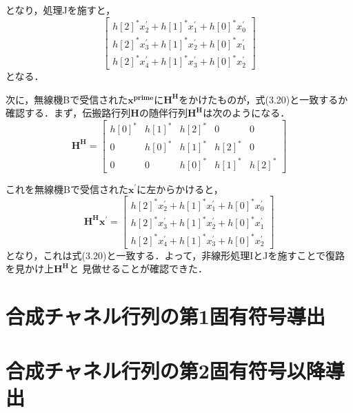 となり，処理Jを施すと，
\begin{equation}
    \left[
        \begin{array}{c}
            h[2]^*x_2^{\prime}+h[1]^*x_1^{\prime}+h[0]^*x_0^{\prime} \\
            h[2]^*x_3^{\prime}+h[1]^*x_2^{\prime}+h[0]^*x_1^{\prime} \\
            h[2]^*x_4^{\prime}+h[1]^*x_3^{\prime}+h[0]^*x_2^{\prime}
        \end{array}
    \right]
\end{equation}
となる．

次に，無線機Bで受信された$\bm{x^{prime}}$に$\bm{H^H}$をかけたものが，式(3.20)と一致するか
確認する．まず，伝搬路行列$\bm{H}$の随伴行列$\bm{H^H}$は次のようになる．
\begin{equation}
    \bm{H^H} = \left[
        \begin{array}{ccccc}
            h[0]^* & h[1]^* & h[2]^* & 0 & 0 \\
            0 & h[0]^* & h[1]^* & h[2]^* & 0 \\
            0 & 0 & h[0]^* & h[1]^* & h[2]^*
        \end{array}
    \right]
\end{equation}

これを無線機Bで受信された$\bm{x^{\prime}}$に左からかけると，
\begin{equation}
    \bm{H^Hx^{\prime}} = \left[
        \begin{array}{c}
            h[2]^*x_2^{\prime}+h[1]^*x_1^{\prime}+h[0]^*x_0^{\prime} \\
            h[2]^*x_3^{\prime}+h[1]^*x_2^{\prime}+h[0]^*x_1^{\prime} \\
            h[2]^*x_4^{\prime}+h[1]^*x_3^{\prime}+h[0]^*x_2^{\prime}
        \end{array}
    \right]
\end{equation}
となり，これは式(3.20)と一致する．よって，非線形処理IとJを施すことで復路を見かけ上$\bm{H^H}$と
見做せることが確認できた．

\section{合成チャネル行列の第1固有符号導出}

\section{合成チャネル行列の第2固有符号以降導出}
